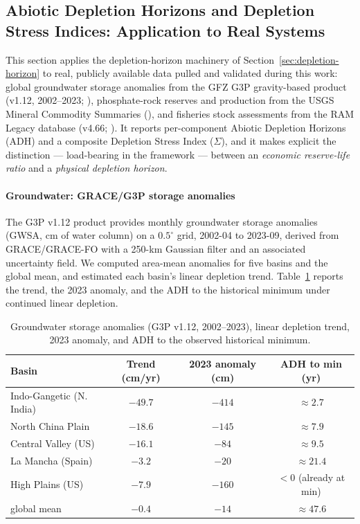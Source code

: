 \documentclass[twocolumn,10pt]{article}
\begin{document}
\subsection{Abiotic Depletion Horizons and Depletion Stress Indices: Application to Real Systems}
\label{sec:adh-results}

This section applies the depletion-horizon machinery of Section~\ref{sec:depletion-horizon} to real, publicly available data pulled and validated during this work: global groundwater storage anomalies from the GFZ G3P gravity-based product (v1.12, 2002--2023; \cite{guentner2024}), phosphate-rock reserves and production from the USGS Mineral Commodity Summaries (\cite{usgsmcs}), and fisheries stock assessments from the RAM Legacy database (v4.66; \cite{ricard2012}). It reports per-component Abiotic Depletion Horizons (ADH) and a composite Depletion Stress Index ($\Sigma$), and it makes explicit the distinction --- load-bearing in the framework --- between an \emph{economic reserve-life ratio} and a \emph{physical depletion horizon}.

\paragraph{Groundwater: GRACE/G3P storage anomalies}
\label{sec:adh-groundwater}

The G3P v1.12 product provides monthly groundwater storage anomalies (GWSA, cm of water column) on a $0.5^\circ$ grid, 2002-04 to 2023-09, derived from GRACE/GRACE-FO with a 250-km Gaussian filter and an associated uncertainty field. We computed area-mean anomalies for five basins and the global mean, and estimated each basin's linear depletion trend. Table~\ref{tab:adh-gw} reports the trend, the 2023 anomaly, and the ADH to the historical minimum under continued linear depletion.

\begin{table}[h]
\centering
\small
\caption{Groundwater storage anomalies (G3P v1.12, 2002--2023), linear depletion trend, 2023 anomaly, and ADH to the observed historical minimum.}
\label{tab:adh-gw}
\begin{tabular}{lccc}
\toprule
Basin & Trend (cm/yr) & 2023 anomaly (cm) & ADH to min (yr) \\
\midrule
Indo-Gangetic (N. India) & $-49.7$ & $-414$ & $\approx 2.7$ \\
North China Plain & $-18.6$ & $-145$ & $\approx 7.9$ \\
Central Valley (US) & $-16.1$ & $-84$ & $\approx 9.5$ \\
La Mancha (Spain) & $-3.2$ & $-20$ & $\approx 21.4$ \\
High Plains (US) & $-7.9$ & $-160$ & $<0$ (already at min) \\
global mean & $-0.4$ & $-14$ & $\approx 47.6$ \\
\bottomrule
\end{tabular}
\end{table}
\end{document}
